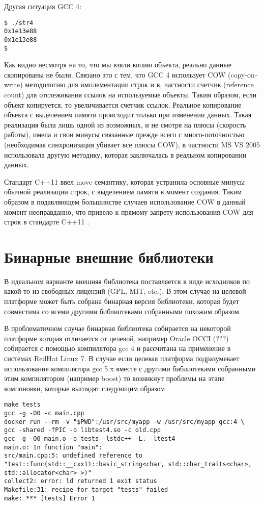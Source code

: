 \documentclass[14pt,a4paper]{article}
\begin{document}
Другая ситуация GCC 4:
\begin{verbatim}
$ ./str4
0x1e13e88
0x1e13e88
$
\end{verbatim}

Как видно несмотря на то, что мы взяли копию объекта, реально данные
скопированы не были. Связано это с тем, что GCC 4 использует COW
(copy-on-write) методологию 
для имплементации строк и в, частности счетчик (reference count) для
отслеживания ссылок на используемые объекты. Таким образом, если объект
копируется, то увеличивается счетчик ссылок. Реальное копирование
объекта с выделением памяти происходит только при изменении данных.
Такая реализация была 
лишь одной из возможных, и не смотря на плюсы (скорость работы), имела
и свои минусы связанные прежде всего с много-поточностью (необходимая
синхронизация убивает все плюсы COW), в частности MS VS 2005
использовала другую методику, которая заключалась в реальном
копировании данных. 

Стандарт C++11 ввел move семантику, которая устранила основные
минусы обычной реализации строк, с выделением памяти в момент
создания. Таким образом в подавляющем большинстве случаев
использование COW в данный момент неоправданно, что привело к прямому
запрету использования COW для строк в стандарте C++11
\cite{ISO:2012:III}. 

\section{Бинарные внешние библиотеки}

В идеальном варианте внешняя библиотека поставляется в виде исходников
по какой-то из свободных лицензий (GPL, MIT, etc.). В этом случае на
целевой платформе может быть собрана бинарная версия библиотеки,
которая будет совместима со всеми другими библиотеками собранными
похожим образом. 

В проблематичном случае бинарная библиотека собирается на некоторой
платформе которая отличается от целевой, например Oracle OCCI (???)
собирается с помощью компилятора gcc 4 и рассчитана на применение в
системах RedHat Linux 7. В случае если целевая платформа подразумевает
использование компилятора gcc 5.x вместе с другими библиотеками
собранными этим компилятором (например boost) то возникнут проблемы
на этапе компоновки, которые выглядят следующим образом

\begin{verbatim}
make tests
gcc -g -O0 -c main.cpp 
docker run --rm -v "$PWD":/usr/src/myapp -w /usr/src/myapp gcc:4 \
gcc -shared -fPIC -o libtest4.so -c old.cpp
gcc -g -O0 main.o -o tests -lstdc++ -L. -ltest4
main.o: In function "main":
src/main.cpp:5: undefined reference to 
"test::func(std::__cxx11::basic_string<char, std::char_traits<char>, 
std::allocator<char> >)"
collect2: error: ld returned 1 exit status
Makefile:31: recipe for target "tests" failed
make: *** [tests] Error 1
\end{verbatim}
\end{document}
